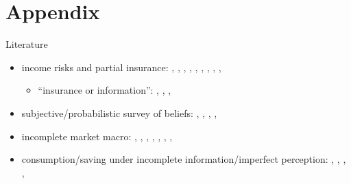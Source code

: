 \documentclass{beamer}
\begin{document}


\section*{Appendix}


\begin{frame}{Literature}
	\begin{itemize}
		\item income risks and partial insurance: {\scriptsize\cite{gottschalk1994growth}, \cite{carroll1997nature}, \cite{meghir2004income}, \cite{storesletten2004cyclical}, \cite{blundell_consumption_2008}, \cite{moffitt2002trends}, \cite{low2010wage},  \cite{guvenen2014nature},  \cite{arellano2017earnings}, \cite{bloom2018great}}
		\begin{itemize}
			\item ``insurance or information'': {\scriptsize \cite{pistaferri_superior_2001}, \cite{kaufmann_disentangling_2009}, \cite{meghir2011earnings}, \cite{kaplan2010much}}
		\end{itemize}
		\item subjective/probabilistic survey of beliefs: {\scriptsize\cite{manski_measuring_2004}, \cite{delavande2011measuring}, \cite{manski_survey_2018},  \cite{bertrand_people_2001}, \cite{armantier_overview_2017}} 
		\item incomplete market macro: {\scriptsize\cite{bewley1976permanent}, 
			\cite{aiyagari1994uninsured},
			\cite{huggett1996wealth}, \cite{krusell1998income}, \cite{heathcote2009quantitative},  \cite{carroll2017distribution}, \cite{krueger2016macroeconomics},  \cite{bayer2019precautionary}}
		\item consumption/saving under incomplete information/imperfect perception:  {\scriptsize\cite{pischke1995individual}, \cite{wang2004precautionary}, \cite{rozsypal_overpersistence_2017}, \cite{carroll_sticky_2018}, \cite{lian2019imperfect}}
		
	\end{itemize}
\end{frame}
\end{document}
